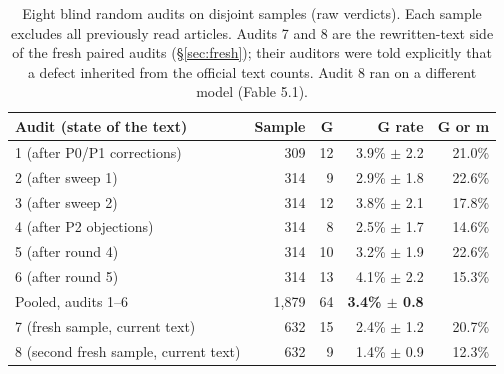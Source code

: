 \documentclass[11pt,a4paper]{article}
\begin{document}
\begin{table}[ht]
\centering
\small
\begin{tabular}{lrrrr}
\toprule
Audit (state of the text) & Sample & G & G rate & G or m\\
\midrule
1 (after P0/P1 corrections) & 309 & 12 & 3.9\% $\pm$ 2.2 & 21.0\%\\
2 (after sweep 1) & 314 & 9 & 2.9\% $\pm$ 1.8 & 22.6\%\\
3 (after sweep 2) & 314 & 12 & 3.8\% $\pm$ 2.1 & 17.8\%\\
4 (after P2 objections) & 314 & 8 & 2.5\% $\pm$ 1.7 & 14.6\%\\
5 (after round 4) & 314 & 10 & 3.2\% $\pm$ 1.9 & 22.6\%\\
6 (after round 5) & 314 & 13 & 4.1\% $\pm$ 2.2 & 15.3\%\\
\midrule
Pooled, audits 1--6 & 1{,}879 & 64 & \textbf{3.4\% $\pm$ 0.8} & \\
\midrule
7 (fresh sample, current text) & 632 & 15 & 2.4\% $\pm$ 1.2 & 20.7\%\\
8 (second fresh sample, current text) & 632 & 9 & 1.4\% $\pm$ 0.9 & 12.3\%\\
\bottomrule
\end{tabular}
\caption{Eight blind random audits on disjoint samples (raw verdicts). Each sample excludes all previously read articles. Audits 7 and 8 are the rewritten-text side of the fresh paired audits (\S\ref{sec:fresh}); their auditors were told explicitly that a defect inherited from the official text counts. Audit 8 ran on a different model (Fable 5.1).}
\label{tab:audits}
\end{table}
\end{document}
